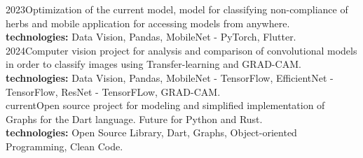 \documentclass[
    10pt,
    english,
]{article}
\begin{document}
\noindent {}
{}{2023}{\tab[0.01cm] Optimization of the current model, model for classifying non-compliance of herbs and \tab[0.01cm] mobile application for accessing models from anywhere. \\ \tab[0.01cm] \textbf{technologies:} Data Vision, Pandas, MobileNet - PyTorch, Flutter.}
\\
{}{2024}{Computer vision project for analysis and comparison of convolutional models in order to classify images using Transfer-learning and GRAD-CAM. \\ \textbf{technologies:} Data Vision, Pandas, MobileNet - TensorFlow, EfficientNet - TensorFlow, ResNet - TensorFLow, GRAD-CAM.}
\\
{}{current}{Open source project for modeling and simplified implementation of Graphs for the Dart language. Future for Python and Rust. \\ \textbf{technologies:} Open Source Library, Dart, Graphs, Object-oriented Programming, Clean Code.}
\end{document}
